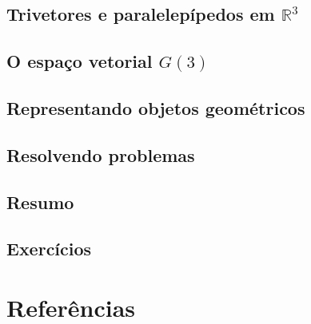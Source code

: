 \documentclass[
  letterpaper,
  DIV=11,
  numbers=noendperiod]{scrreprt}
\newlength{\cslhangindent}
\newlength{\cslentryspacingunit} %
\newenvironment{CSLReferences}[2] %
 {%
  \setlength{\parindent}{0pt}
  \ifodd #1
  \let\oldpar\par
  \def\par{\hangindent=\cslhangindent\oldpar}
  \fi
  \setlength{\parskip}{#2\cslentryspacingunit}
 }%
 {}
\begin{document}
\hypertarget{trivetores-e-paralelepuxedpedos-em-mathbbr3}{%
\section{\texorpdfstring{Trivetores e paralelepípedos em
$\mathbb{R}^3$}{Trivetores e paralelepípedos em }}\label{trivetores-e-paralelepuxedpedos-em-mathbbr3}}

\hypertarget{o-espauxe7o-vetorial-g3}{%
\section{\texorpdfstring{O espaço vetorial
$G(3)$}{O espaço vetorial }}\label{o-espauxe7o-vetorial-g3}}

\hypertarget{representando-objetos-geomuxe9tricos}{%
\section{Representando objetos
geométricos}\label{representando-objetos-geomuxe9tricos}}

\hypertarget{resolvendo-problemas}{%
\section{Resolvendo problemas}\label{resolvendo-problemas}}

\hypertarget{resumo}{%
\section{Resumo}\label{resumo}}

\hypertarget{exercuxedcios}{%
\section{Exercícios}\label{exercuxedcios}}

\hypertarget{referuxeancias-1}{%
\chapter*{Referências}\label{referuxeancias-1}}

\hypertarget{refs}{}
\begin{CSLReferences}{0}{0}
\end{CSLReferences}
\end{document}
